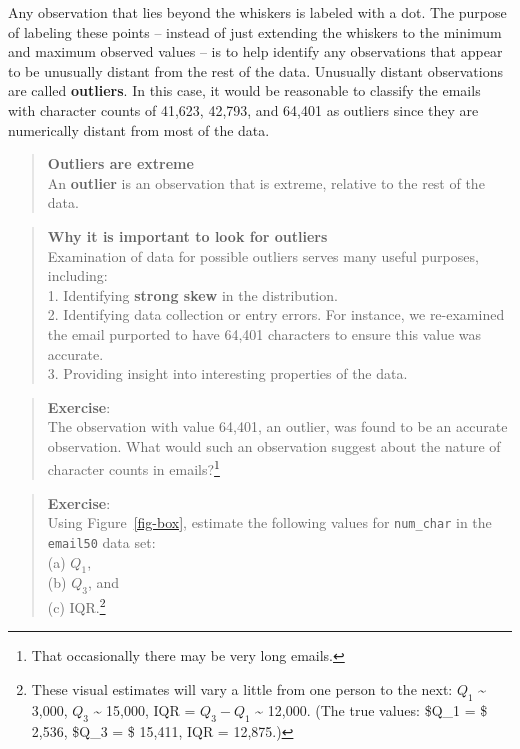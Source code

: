 \documentclass[
  letterpaper,
  DIV=11,
  numbers=noendperiod]{scrreprt}
\begin{document}
Any observation that lies beyond the whiskers is labeled with a dot. The
purpose of labeling these points -- instead of just extending the
whiskers to the minimum and maximum observed values -- is to help
identify any observations that appear to be unusually distant from the
rest of the data. Unusually distant observations are called
\textbf{outliers}. In this case, it would be reasonable to classify the
emails with character counts of 41,623, 42,793, and 64,401 as outliers
since they are numerically distant from most of the data.

\begin{quote}
\textbf{Outliers are extreme}\\
An \textbf{outlier} is an observation that is extreme, relative to the
rest of the data.
\end{quote}

\begin{quote}
\textbf{Why it is important to look for outliers}\\
Examination of data for possible outliers serves many useful purposes,
including:\\
1. Identifying \textbf{strong skew} in the distribution.\\
2. Identifying data collection or entry errors. For instance, we
re-examined the email purported to have 64,401 characters to ensure this
value was accurate.\\
3. Providing insight into interesting properties of the data.
\end{quote}

\begin{quote}
\textbf{Exercise}:\\
The observation with value 64,401, an outlier, was found to be an
accurate observation. What would such an observation suggest about the
nature of character counts in emails?\footnote{That occasionally there
  may be very long emails.}
\end{quote}

\begin{quote}
\textbf{Exercise}:\\
Using Figure~\ref{fig-box}, estimate the following values for
\texttt{num\_char} in the \texttt{email50} data set:\\
(a) \(Q_1\),\\
(b) \(Q_3\), and\\
(c) IQR.\footnote{These visual estimates will vary a little from one
  person to the next: \(Q_1\) \textasciitilde{} 3,000, \(Q_3\)
  \textasciitilde{} 15,000, IQR = \(Q_3 - Q_1\) \textasciitilde{}
  12,000. (The true values: \$Q\_1 = \$ 2,536, \$Q\_3 = \$ 15,411, IQR =
  12,875.)}
\end{quote}
\end{document}
